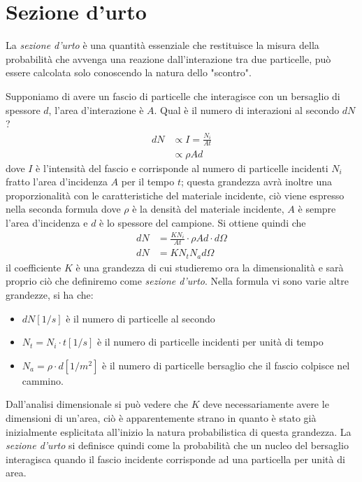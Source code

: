 
\section{Sezione d'urto}


La \emph{sezione d'urto} è una quantità essenziale che restituisce la misura della probabilità che avvenga una reazione dall'interazione tra due particelle, può essere calcolata solo conoscendo la natura dello "scontro".

Supponiamo di avere un fascio di particelle che interagisce con un bersaglio di spessore $d$, l'area d'interazione è $A$.
Qual è il numero di interazioni al secondo $dN$?
\begin{equation}
\begin{split}
dN &\propto I=\frac{N_i}{At}\\
&\propto \rho A d
\end{split}
\end{equation}
dove $I$ è l'intensità del fascio e corrisponde al numero di particelle incidenti $N_i$ fratto l'area d'incidenza $A$ per il tempo $t$; questa grandezza avrà inoltre una proporzionalità con le caratteristiche del materiale incidente, ciò viene espresso nella seconda formula dove $\rho$ è la densità del materiale incidente, $A$ è sempre l'area d'incidenza e $d$ è lo spessore del campione.
Si ottiene quindi che 
\begin{equation}
\begin{split}
dN &=\frac{KN_i}{At}\cdot\rho Ad\cdot d\Omega\\
dN &=KN_tN_ad\Omega
\end{split}
\end{equation}
il coefficiente $K$ è una grandezza di cui studieremo ora la dimensionalità e sarà proprio ciò che definiremo come \emph{sezione d'urto}.
Nella formula vi sono varie altre grandezze, si ha che:
\begin{itemize}
\item $dN [1/s]$ è il numero di particelle al secondo
\item $N_t=N_i\cdot t [1/s]$ è il numero di particelle incidenti per unità di tempo
\item $N_a=\rho \cdot d[1/m^2]$ è il numero di particelle bersaglio che il fascio colpisce nel cammino.
\end{itemize}
Dall'analisi dimensionale si può vedere che $K$ deve necessariamente avere le dimensioni di un'area, ciò è apparentemente strano in quanto è stato già inizialmente esplicitata all'inizio la natura probabilistica di questa grandezza.
La \emph{sezione d'urto} si definisce quindi come la probabilità che un nucleo del bersaglio interagisca quando il fascio incidente corrisponde ad una particella per unità di area.


